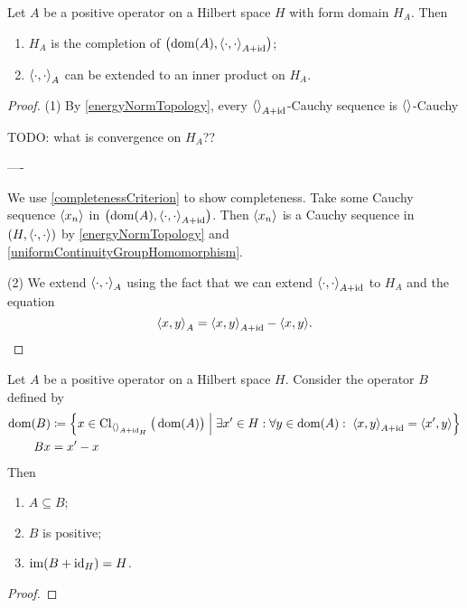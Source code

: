 \begin{lemma}
Let $A$ be a positive operator on a Hilbert space $H$ with form domain $H_A$. Then
\begin{enumerate}
\item $H_A$ is the completion of $\sSet{\dom(A), \inner{\cdot, \cdot}_{A+\id}}$;
\item $\inner{\cdot, \cdot}_A$ can be extended to an inner product on $H_A$.
\end{enumerate}
\end{lemma}
\begin{proof}
(1) By \ref{energyNormTopology}, every $\inner{}_{A+\id}$-Cauchy sequence is $\inner{}$-Cauchy

TODO: what is convergence on $H_A$??

----

We use \ref{completenessCriterion} to show completeness. Take some Cauchy sequence $\left\langle x_n \right\rangle$ in $\sSet{\dom(A), \inner{\cdot, \cdot}_{A+\id}}$. Then $\left\langle x_n \right\rangle$ is a Cauchy sequence in $\sSet{H,\inner{\cdot, \cdot}}$ by \ref{energyNormTopology} and \ref{uniformContinuityGroupHomomorphism}. 

(2) We extend $\inner{\cdot, \cdot}_A$ using the fact that we can extend $\inner{\cdot, \cdot}_{A+\id}$ to $H_A$ and the equation
\[ \inner{x, y}_A = \inner{x, y}_{A+\id} - \inner{x,y}. \]
\end{proof}




\begin{lemma}
Let $A$ be a positive operator on a Hilbert space $H$. Consider the operator $B$ defined by
\begin{align*}
\dom(B) &\defeq \setbuilder{x\in \Closure_{\inner{}_{A+\id_H}}\big(\dom(A)\big)}{\exists x'\in H: \forall y\in \dom(A): \; \inner{x, y}_{A+\id} = \inner{x', y}} \\
Bx &= x' - x 
\end{align*}
Then
\begin{enumerate}
\item $A\subseteq B$;
\item $B$ is positive;
\item $\operatorname{im}(B+\operatorname{id}_H) = H$.
\end{enumerate}
\end{lemma}
\begin{proof}

\end{proof}

